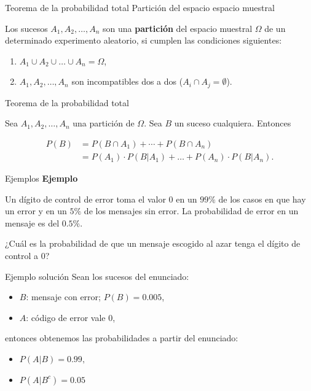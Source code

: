 \documentclass[
  ignorenonframetext,
  aspectratio=169]{beamer}
\providecommand{\tightlist}{%
  \setlength{\itemsep}{0pt}\setlength{\parskip}{0pt}}\usepackage{longtable,booktabs,array}
\begin{document}
\begin{frame}{Teorema de la probabilidad total}
\label{teorema-de-la-probabilidad-total-1}
Partición del espacio espacio muestral

Los sucesos \(A_1,A_2,\ldots, A_n\) son una \textbf{partición} del
espacio muestral \(\Omega\) de un determinado experimento aleatorio, si
cumplen las condiciones siguientes:

\begin{enumerate}
\tightlist
\item
  \(A_1\cup A_2\cup\ldots\cup A_n=\Omega\),
\item
  \(A_1,A_2,\ldots,A_n\) son incompatibles dos a dos
  (\(A_i\cap A_j=\emptyset\)).
\end{enumerate}

Teorema de la probabilidad total

Sea \(A_1,A_2,\ldots,A_n\) una partición de \(\Omega\). Sea \(B\) un
suceso cualquiera. Entonces

\[
\begin{array}{rl}
P(B)&= P(B\cap A_1)+\cdots +P(B\cap A_n)\\
& =P(A_1)\cdot P(B|A_1)+\ldots+P(A_n)\cdot P(B|A_n).
\end{array}
\]
\end{frame}

\begin{frame}{Ejemplos}
\label{ejemplos-3}
\textbf{Ejemplo}

Un dígito de control de error toma el valor 0 en un \(99\%\) de los
casos en que hay un error y en un \(5\%\) de los mensajes sin error. La
probabilidad de error en un mensaje es del \(0.5\%\).

¿Cuál es la probabilidad de que un mensaje escogido al azar tenga el
dígito de control a 0?
\end{frame}

\begin{frame}{Ejemplo solución}
\label{ejemplo-soluciuxf3n}
Sean los sucesos del enunciado:

\begin{itemize}
\tightlist
\item
  \(B\): mensaje con error; \(P(B)=0.005\),
\item
  \(A\): código de error vale 0,
\end{itemize}

entonces obtenemos las probabilidades a partir del enunciado:

\begin{itemize}
\tightlist
\item
  \(P(A|B)=0.99,\)
\item
  \(P(A|B^c)= 0.05\)
\end{itemize}
\end{frame}
\end{document}

